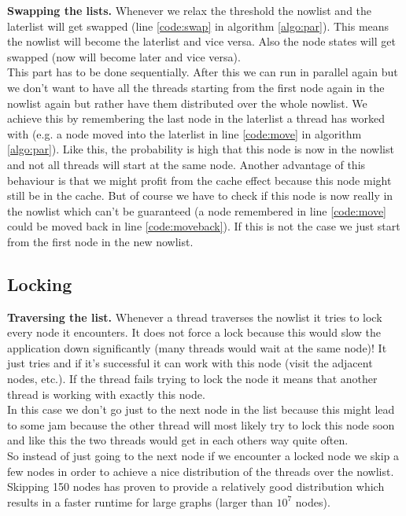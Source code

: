\documentclass[letterpaper]{article}
\newcommand{\mypar}[1]{{\bf #1.}}
\begin{document}
\mypar{Swapping the lists}
Whenever we relax the threshold the nowlist and the laterlist will get swapped (line \ref{code:swap} in algorithm \ref{algo:par}). This means the nowlist will become the laterlist and vice versa. Also the node states will get swapped (now will become later and vice versa).\\
This part has to be done sequentially. After this we can run in parallel again but we don't want to have all the threads starting from the first node again in the nowlist again but rather have them distributed over the whole nowlist. We achieve this by remembering the last node in the laterlist a thread has worked with (e.g. a node moved into the laterlist in line \ref{code:move} in algorithm \ref{algo:par}). Like this, the probability is high that this node is now in the nowlist and not all threads will start at the same node. Another advantage of this behaviour is that we might profit from the cache effect because this node might still be in the cache. But of course we have to check if this node is now really in the nowlist which can't be guaranteed (a node remembered in line \ref{code:move} could be moved back in line \ref{code:moveback}). If this is not the case we just start from the first node in the new nowlist.

\subsection{Locking}\label{ssec:lock}

\mypar{Traversing the list}
Whenever a thread traverses the nowlist it tries to lock every node it encounters. It does not force a lock because this would slow the application down significantly (many threads would wait at the same node)! It just tries and if it's successful it can work with this node (visit the adjacent nodes, etc.). If the thread fails trying to lock the node it means that another thread is working with exactly this node.\\
In this case we don't go just to the next node in the list because this might lead to some jam because the other thread will most likely try to lock this node soon and like this the two threads would get in each others way quite often.\\
So instead of just going to the next node if we encounter a locked node we skip a few nodes in order to achieve a nice distribution of the threads over the nowlist. Skipping 150 nodes has proven to provide a relatively good distribution which results in a faster runtime for large graphs (larger than $10^7$ nodes).
\end{document}
